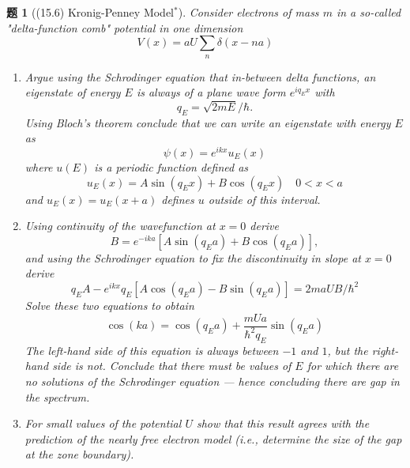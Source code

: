 \documentclass[UTF8,10pt,a4paper]{article}
\theoremstyle{Problem}
\newtheorem{prob}{题}
\theoremstyle{Solution}
\begin{document}
\begin{prob}[(15.6) Kronig-Penney Model$^*$]
    Consider electrons of mass $m$ in a so-called "delta-function comb" potential in one dimension
    \[
        V(x)=aU\sum_n\delta(x-na)
    \]
    \begin{enumerate}
        \item[(a)] Argue using the Schrodinger equation that in-between delta functions, an eigenstate of energy $E$ is always of a plane wave form $e^{iq_Ex}$ with
        \[
            q_E=\sqrt{2mE}/\hbar.
        \]
        Using Bloch's theorem conclude that we can write an eigenstate with energy $E$ as
        \[
            \psi(x)=e^{ikx}u_E(x)
        \]
        where $u(E)$ is a periodic function defined as
        \[
            u_E(x)=A\sin(q_Ex)+B\cos(q_Ex)\quad 0<x<a
        \]
        and $u_E(x)=u_E(x+a)$ defines $u$ outside of this interval.
        \item[(b)] Using continuity of the wavefunction at $x=0$ derive
        \[
            B=e^{-ika}[A\sin(q_Ea)+B\cos(q_Ea)],
        \]
        and using the Schrodinger equation to fix the discontinuity in slope at $x=0$ derive
        \[
            q_EA-e^{ikx}q_E[A\cos(q_Ea)-B\sin(q_Ea)]=2maUB/\hbar^2
        \]
        Solve these two equations to obtain
        \[
            \cos(ka)=\cos(q_Ea)+\frac{mUa}{\hbar^2q_E}\sin(q_Ea)
        \]
        The left-hand side of this equation is always between $-1$ and $1$, but the right-hand side is not. Conclude that there must be values of $E$ for which there are no solutions of the Schrodinger equation --- hence concluding there are gap in the spectrum.
        \item[(c)] For small values of the potential $U$ show that this result agrees with the prediction of the nearly free electron model (i.e., determine the size of the gap at the zone boundary).
    \end{enumerate}
\end{prob}
\end{document}
